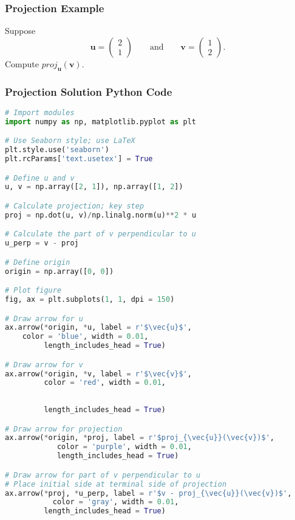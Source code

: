 \documentclass{beamer}
\begin{document}
\begin{frame}[t]
\frametitle{Projection Example}

\begin{Example}
Suppose
$$
{\boldsymbol u} = \left(\begin{array}{c} 2\\ 1\end{array}\right)\qquad\text{and}\qquad {\boldsymbol v} = \left(\begin{array}{c} 1\\ 2\end{array}\right).
$$
Compute $proj_{\boldsymbol u}( {\boldsymbol v})$.
\end{Example}

\end{frame}

\begin{frame}[fragile]
\frametitle{Projection Solution Python Code}

\begin{multicols}{2}
\begin{lstlisting}[language=Python]
# Import modules
import numpy as np, matplotlib.pyplot as plt

# Use Seaborn style; use LaTeX
plt.style.use('seaborn')
plt.rcParams['text.usetex'] = True

# Define u and v
u, v = np.array([2, 1]), np.array([1, 2])

# Calculate projection; key step
proj = np.dot(u, v)/np.linalg.norm(u)**2 * u

# Calculate the part of v perpendicular to u
u_perp = v - proj

# Define origin
origin = np.array([0, 0])

# Plot figure
fig, ax = plt.subplots(1, 1, dpi = 150)

# Draw arrow for u
ax.arrow(*origin, *u, label = r'$\vec{u}$', 
	color = 'blue', width = 0.01, 
         length_includes_head = True)

# Draw arrow for v
ax.arrow(*origin, *v, label = r'$\vec{v}$', 
         color = 'red', width = 0.01, 
         
         
         length_includes_head = True)

# Draw arrow for projection
ax.arrow(*origin, *proj, label = r'$proj_{\vec{u}}(\vec{v})$', 
           	color = 'purple', width = 0.01, 
         	length_includes_head = True)

# Draw arrow for part of v perpendicular to u
# Place initial side at terminal side of projection
ax.arrow(*proj, *u_perp, label = r'$v - proj_{\vec{u}}(\vec{v})$', 
           color = 'gray', width = 0.01, 
         length_includes_head = True)


\end{lstlisting}
\end{multicols}
\end{frame}
\end{document}
